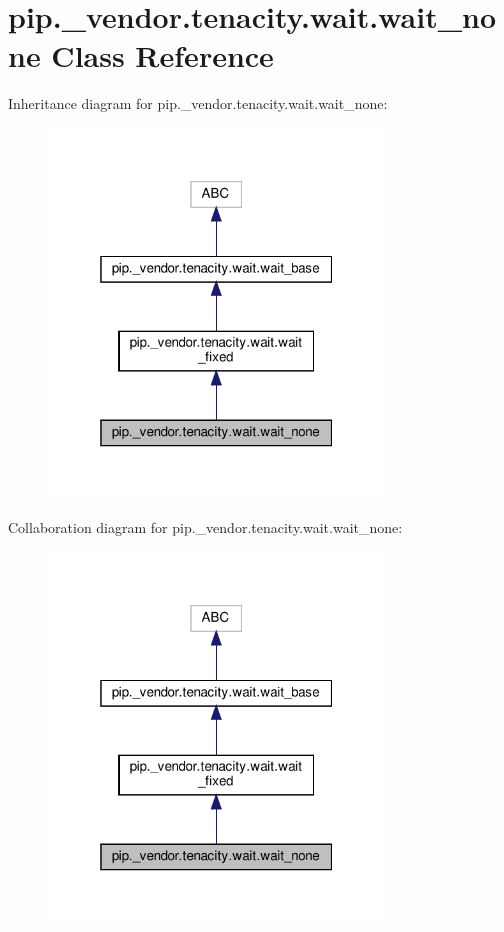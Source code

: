 \hypertarget{classpip_1_1__vendor_1_1tenacity_1_1wait_1_1wait__none}{}\section{pip.\+\_\+vendor.\+tenacity.\+wait.\+wait\+\_\+none Class Reference}
\label{classpip_1_1__vendor_1_1tenacity_1_1wait_1_1wait__none}


Inheritance diagram for pip.\+\_\+vendor.\+tenacity.\+wait.\+wait\+\_\+none\+:
\nopagebreak
\begin{figure}[H]
\begin{center}
\leavevmode
\includegraphics[width=253pt]{classpip_1_1__vendor_1_1tenacity_1_1wait_1_1wait__none__inherit__graph}
\end{center}
\end{figure}


Collaboration diagram for pip.\+\_\+vendor.\+tenacity.\+wait.\+wait\+\_\+none\+:
\nopagebreak
\begin{figure}[H]
\begin{center}
\leavevmode
\includegraphics[width=253pt]{classpip_1_1__vendor_1_1tenacity_1_1wait_1_1wait__none__coll__graph}
\end{center}
\end{figure}
